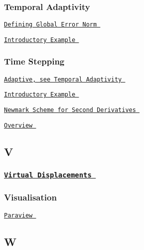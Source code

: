  \subsubsection*{ Temporal Adaptivity }

 
\begin{DoxyItemize}
\item  \href{ ../../unsteady_heat/two_d_unsteady_heat_t_adapt/html/index.html#error }{\tt Defining Global Error Norm }  
\item  \href{ ../../unsteady_heat/two_d_unsteady_heat_t_adapt/html/index.html }{\tt Introductory Example }  
\end{DoxyItemize} \subsubsection*{ Time Stepping }

 
\begin{DoxyItemize}
\item  \href{ ../../index/html/index.html#T.TemporalAdaptivity }{\tt Adaptive, see Temporal Adaptivity }  
\item  \href{ ../../unsteady_heat/two_d_unsteady_heat/html/index.html }{\tt Introductory Example }  
\item  \href{ ../../linear_wave/two_d_linear_wave/html/index.html#IC }{\tt Newmark Scheme for Second Derivatives }  
\item  \href{ ../../the_data_structure/html/index.html#timestepping }{\tt Overview }  
\end{DoxyItemize}  \subsection*{ V }

 \subsubsection*{ \href{ ../../solid/solid_theory/html/index.html#equilibrium }{\tt Virtual Displacements } }

\subsubsection*{ Visualisation }

 
\begin{DoxyItemize}
\item  \href{ ../../paraview/html/index.html }{\tt Paraview }  
\end{DoxyItemize}  \subsection*{ W }

